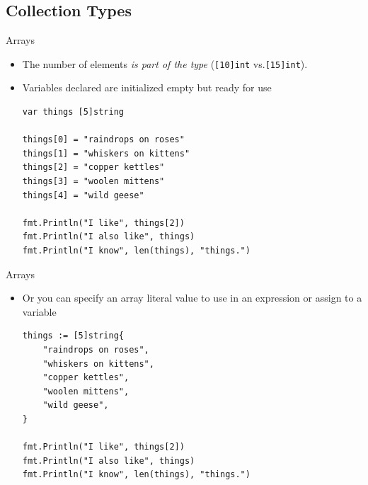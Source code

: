 \documentclass[pdf]{beamer}
\newcommand\z[1]{\texttt{#1}}
\newcommand\keyword[1]{{\color{blue}\z{#1}}}
\begin{document}
\subsection{Collection Types}
\begin{frame}[fragile]{Arrays}
    \begin{itemize}
        \item The number of elements \emph{is part of the type} (\z{[10]}\keyword{int} vs.\@ \z{[15]}\keyword{int}).
            \pause
        \item Variables declared are initialized empty but ready for use
\begin{lstlisting}
var things [5]string

things[0] = "raindrops on roses"
things[1] = "whiskers on kittens"
things[2] = "copper kettles"
things[3] = "woolen mittens"
things[4] = "wild geese"

fmt.Println("I like", things[2])
fmt.Println("I also like", things)
fmt.Println("I know", len(things), "things.")
\end{lstlisting}
    \end{itemize}
\end{frame}

\begin{frame}[fragile]{Arrays}
    \begin{itemize}
        \item Or you can specify an array literal value to use in an expression or assign to a variable
\begin{lstlisting}
things := [5]string{
    "raindrops on roses",
    "whiskers on kittens",
    "copper kettles",
    "woolen mittens",
    "wild geese",
}

fmt.Println("I like", things[2])
fmt.Println("I also like", things)
fmt.Println("I know", len(things), "things.")
\end{lstlisting}
    \end{itemize}
\end{frame}
\end{document}

